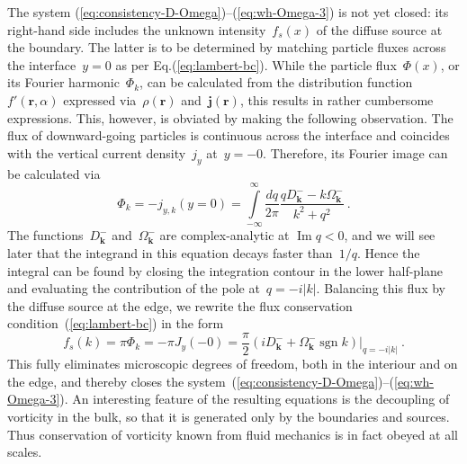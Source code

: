 \documentclass[preprint,aps,eqsecnum]{revtex4-1}
\newcommand{\fminus}[1]{{#1}^{-}}
\renewcommand{\Im}{\mathop{\mathrm{Im}}\nolimits}
\newcommand{\sgn}{\mathop{\mathrm{sgn}}\nolimits}
\begin{document}
The system (\ref{eq:consistency-D-Omega})--(\ref{eq:wh-Omega-3})
is not yet closed:
its right-hand side includes the unknown intensity~$f_s(x)$
of the diffuse source at the boundary.
The latter is to be determined by matching particle fluxes across the
interface~$y = 0$ as per Eq.(\ref{eq:lambert-bc}).
While the particle flux~$\Phi(x)$, or its Fourier harmonic~$\Phi_k$,
can be calculated from
the distribution function~$f'({\bm r}, \alpha)$ expressed
via~$\rho({\bm r})$ and~${\bm j}({\bm r})$,
this results in rather cumbersome expressions.
This, however, is obviated by making the following observation.
The flux of downward-going particles is continuous across the interface
and coincides with the vertical current density~$j_y$ at~$y = -0$.
Therefore, its Fourier image can be calculated via
\begin{equation}
  \Phi_{k} = -j_{y, k}(y=0)
  = \int\limits_{-\infty}^{\infty} \frac{dq}{2\pi}
          \frac{q \fminus{D}_{\bm k} - k\fminus{\Omega}_{\bm k}}{k^2 + q^2}
  \ .
\end{equation}
The functions~$\fminus{D}_{\bm k}$ and~$\fminus{\Omega}_{\bm k}$ are
complex-analytic at $\Im q < 0$, and we will see later that the integrand
in this equation decays faster than~$1/q$. Hence the integral can be found
by closing the integration contour in the lower half-plane and evaluating
the contribution of the pole at~$q = -i |k|$. Balancing this flux by the
diffuse source at the edge,
we rewrite the flux conservation condition~(\ref{eq:lambert-bc}) in the form
\begin{equation}
  \label{eq:Phi-D-Omega}
  f_s(k) = \pi\Phi_k = - \pi J_y(-0) =  \frac{\pi}{2}
      \left.\left(i\fminus{D}_{\bm k}
           + \fminus{\Omega}_{\bm k} \sgn k\right)\right|_{q  = -i |k|}
  \ .
\end{equation}
This fully eliminates microscopic degrees of freedom, both in
the interiour and on the edge, and thereby
closes the system~(\ref{eq:consistency-D-Omega})--(\ref{eq:wh-Omega-3}).
An interesting feature of the resulting equations is the decoupling
of vorticity in the bulk, so that it is generated only by the
boundaries and sources. Thus conservation of vorticity known
from fluid mechanics is in fact obeyed at all scales.
\end{document}
